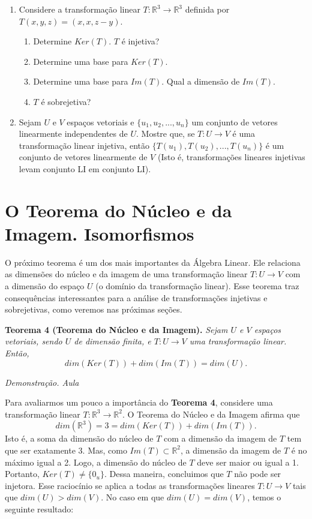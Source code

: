 \begin{enumerate}

\item Considere a transformação linear  $T: \mathbb{R}^3 \rightarrow \mathbb{R}^3$ definida por $T(x,y,z)=(x,x, z-y)$.

\begin{enumerate}[label=(\alph*)]
\item Determine $Ker(T)$. $T$ é injetiva?
\item Determine uma base para $Ker(T)$.
\item Determine uma base para $Im(T)$. Qual a dimensão de $Im(T)$.
\item $T$ é sobrejetiva?
\end{enumerate}

\item Sejam $U$ e $V$ espaços vetoriais e  $\{u_1, u_2,...,u_n\}$  um conjunto de vetores linearmente independentes de $U$. Mostre que, se $T: U \rightarrow V$ é uma transformação linear injetiva, então  $\{T(u_1), T(u_2),...,T(u_n)\}$  é um conjunto de vetores linearmente de $V$ (Isto é, transformações lineares injetivas levam conjunto LI em conjunto LI).
\end{enumerate}

\section{O Teorema do Núcleo e da Imagem. Isomorfismos}

O próximo teorema é um dos mais importantes da Álgebra Linear. Ele relaciona as dimensões do núcleo e da imagem de uma transformação linear  $T: U \rightarrow V$  com  a dimensão do espaço $U$ (o domínio da transformação linear). Esse teorema traz consequências interessantes para a análise de transformações injetivas e sobrejetivas, como veremos nas próximas seções.

\vspace{1cm}
\noindent \textbf{Teorema 4 (Teorema do Núcleo e da Imagem).} \textit{Sejam $U$ e $V$ espaços vetoriais, sendo $U$ de dimensão finita,  e  $T: U \rightarrow V$ uma transformação linear. Então, $$dim(Ker(T)) + dim(Im(T))=dim(U).$$}

\noindent\textit{Demonstração. Aula}


Para avaliarmos um pouco a importância do \textbf{Teorema 4},  considere uma transformação  linear $T: \mathbb{R}^3 \rightarrow \mathbb{R}^2$. O Teorema do Núcleo e da Imagem afirma que $$dim( \mathbb{R}^3 ) =3=dim(Ker(T))+ dim(Im(T)).$$ Isto é, a soma da dimensão do núcleo de $T$ com a dimensão da imagem de $T$ tem que ser exatamente 3. Mas, como $Im(T) \subset \mathbb{R}^2$, a dimensão da imagem de $T$ é no máximo igual a 2. Logo, a dimensão do núcleo de $T$ deve ser maior ou igual a 1. Portanto, $Ker(T)\neq \{ 0_u\}$. Dessa maneira, concluimos que  $T$ não pode ser injetora. Esse raciocínio se aplica a todas as transformações lineares  $T: U \rightarrow V$  tais que $dim(U) > dim(V)$. No caso em que $dim(U) = dim(V)$, temos o seguinte resultado:


